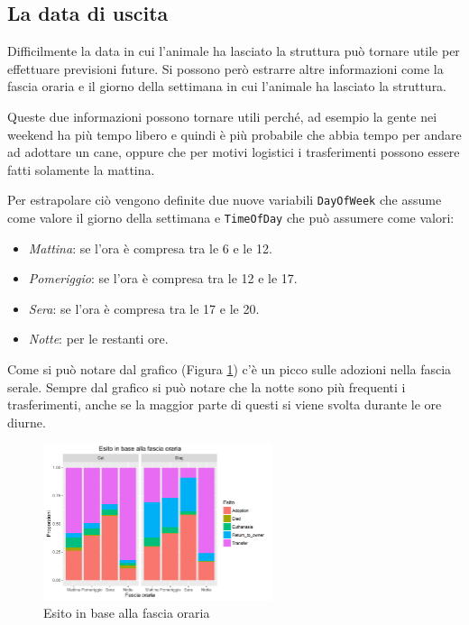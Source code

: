 \subsection{La data di uscita}

Difficilmente la data in cui l'animale ha lasciato la struttura può tornare utile per effettuare previsioni future. Si possono però estrarre altre informazioni come la fascia oraria e il giorno della settimana in cui l'animale ha lasciato la struttura. 

Queste due informazioni possono tornare utili perché, ad esempio la gente nei weekend ha più tempo libero e quindi è più probabile che abbia tempo per andare ad adottare un cane, oppure che per motivi logistici i trasferimenti possono essere fatti solamente la mattina.

Per estrapolare ciò vengono definite due nuove variabili \texttt{DayOfWeek} che assume come valore il giorno della settimana e \texttt{TimeOfDay} che può assumere come valori:

\begin{itemize}
	\item \textit{Mattina}: se l'ora è compresa tra le 6 e le 12.
	\item \textit{Pomeriggio}: se l'ora è compresa tra le 12 e le 17.
	\item \textit{Sera}: se l'ora è compresa tra le 17 e le 20.
	\item \textit{Notte}: per le restanti ore.
\end{itemize}

Come si può notare dal grafico (Figura \ref{fig-time}) c'è un picco sulle adozioni nella fascia serale. Sempre dal grafico si può notare che la notte sono più frequenti i trasferimenti, anche se la maggior parte di questi si viene svolta durante le ore diurne.

\begin{figure}[htbp]
	\centering
	\includegraphics[width=0.6\textwidth]{./grafici/esito_time.pdf}
	\caption{Esito in base alla fascia oraria}\label{fig-time}
\end{figure}

